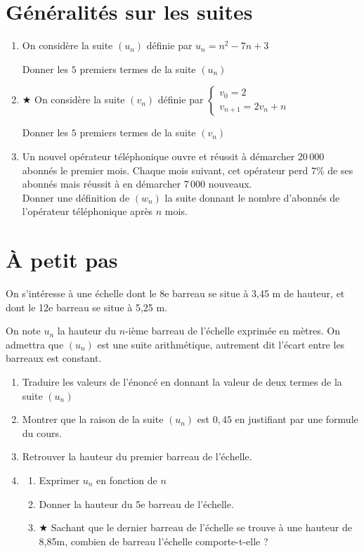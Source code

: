 \documentclass[oneside,12pt]{exam}          %
\begin{document}
\section{Généralités sur les suites}
\begin{enumerate}[itemsep = 0pt]
	\item On considère la suite $(u_n)$ définie par $u_n = n^2 - 7n + 3$ 
	
	Donner les $5$ premiers termes de la suite $(u_n)$
	
	\item $\bigstar$ On considère la suite $(v_n)$ définie par $\begin{cases} v_0 = 2 \\ v_{n+1} = 2v_n + n \end{cases}$ 
	
	Donner les $5$ premiers termes de la suite $(v_n)$
	
	\item Un nouvel opérateur téléphonique ouvre et réussit à démarcher 20\,000 abonnés le premier mois. Chaque mois suivant, cet opérateur perd $7\%$ de ses abonnés mais réussit à en démarcher 7\,000 nouveaux. \\
	Donner une définition de $(w_n)$ la suite donnant le nombre d'abonnés de l'opérateur téléphonique après $n$ mois.
\end{enumerate}



\section{À petit pas}
On s'intéresse à une échelle dont le 8e barreau se situe à 3,45 m de hauteur, et dont le 12e barreau se situe à 5,25 m.

On note $u_n$ la hauteur du $n$-ième barreau de l'échelle exprimée en mètres. On admettra que $(u_n)$ est une suite arithmétique, autrement dit l'écart entre les barreaux est constant.
\begin{enumerate}[itemsep = 0pt]
	\item Traduire les valeurs de l'énoncé en donnant la valeur de deux termes de la suite $(u_n)$
	\item Montrer que la raison de la suite $(u_n)$ est $0,45$ en justifiant par une formule du cours.
	\item Retrouver la hauteur du premier barreau de l'échelle.
	\item 
	\begin{enumerate}
		\item Exprimer $u_n$ en fonction de $n$
		\item Donner la hauteur du 5e barreau de l'échelle.
		\item $\bigstar$ Sachant que le dernier barreau de l'échelle se trouve à une hauteur de 8,85m, combien de barreau l'échelle comporte-t-elle ?
	\end{enumerate}
\end{enumerate}
\end{document}
